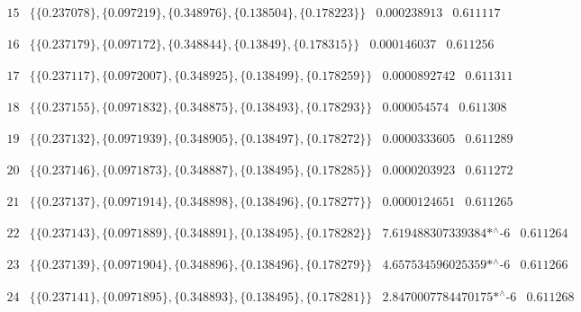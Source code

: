 \documentclass{article}
\begin{document}
\noindent\(
\begin{array}{cccc}
 15 & \{\{0.237078\},\{0.097219\},\{0.348976\},\{0.138504\},\{0.178223\}\} & 0.000238913 & 0.611117
\end{array}
\)

\noindent\(
\begin{array}{cccc}
 16 & \{\{0.237179\},\{0.097172\},\{0.348844\},\{0.13849\},\{0.178315\}\} & 0.000146037 & 0.611256
\end{array}
\)

\noindent\(
\begin{array}{cccc}
 17 & \{\{0.237117\},\{0.0972007\},\{0.348925\},\{0.138499\},\{0.178259\}\} & 0.0000892742 & 0.611311
\end{array}
\)

\noindent\(
\begin{array}{cccc}
 18 & \{\{0.237155\},\{0.0971832\},\{0.348875\},\{0.138493\},\{0.178293\}\} & 0.000054574 & 0.611308
\end{array}
\)

\noindent\(
\begin{array}{cccc}
 19 & \{\{0.237132\},\{0.0971939\},\{0.348905\},\{0.138497\},\{0.178272\}\} & 0.0000333605 & 0.611289
\end{array}
\)

\noindent\(
\begin{array}{cccc}
 20 & \{\{0.237146\},\{0.0971873\},\{0.348887\},\{0.138495\},\{0.178285\}\} & 0.0000203923 & 0.611272
\end{array}
\)

\noindent\(
\begin{array}{cccc}
 21 & \{\{0.237137\},\{0.0971914\},\{0.348898\},\{0.138496\},\{0.178277\}\} & 0.0000124651 & 0.611265
\end{array}
\)

\noindent\(
\begin{array}{cccc}
 22 & \{\{0.237143\},\{0.0971889\},\{0.348891\},\{0.138495\},\{0.178282\}\} & \text{7.619488307339384$\grave{ }$*${}^{\wedge}$-6} & 0.611264
\end{array}
\)

\noindent\(
\begin{array}{cccc}
 23 & \{\{0.237139\},\{0.0971904\},\{0.348896\},\{0.138496\},\{0.178279\}\} & \text{4.657534596025359$\grave{ }$*${}^{\wedge}$-6} & 0.611266
\end{array}
\)

\noindent\(
\begin{array}{cccc}
 24 & \{\{0.237141\},\{0.0971895\},\{0.348893\},\{0.138495\},\{0.178281\}\} & \text{2.8470007784470175$\grave{ }$*${}^{\wedge}$-6} & 0.611268
\end{array}
\)
\end{document}
